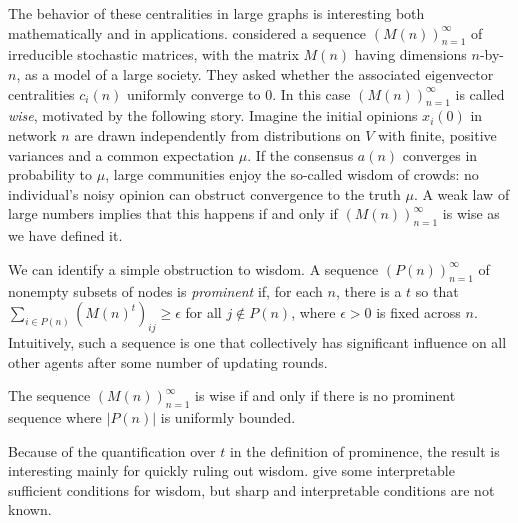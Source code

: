 \documentclass{notices}
\theoremstyle{definition}\newtheorem{problem}{Problem}
\begin{document}
The behavior of these centralities in large graphs is interesting both mathematically and in applications. \cite{GolubJackson2010} considered a sequence $(M(n))_{n=1}^\infty$ of  irreducible stochastic matrices, with the matrix $M(n)$ having dimensions $n$-by-$n$, as a model of a large society. They asked whether the associated eigenvector centralities $c_i(n)$ uniformly converge to $0$. In this case $(M(n))_{n=1}^\infty$ is called \emph{wise}, motivated by the following story. Imagine the initial opinions $x_i(0)$ in network $n$ are drawn independently from distributions on $V$ with finite, positive variances and a common expectation $\mu$. If the consensus $a(n)$ converges in probability  to $\mu$, large communities enjoy the so-called wisdom of crowds: no individual's noisy opinion can obstruct convergence to the truth $\mu$. A weak law of large numbers implies that this happens if and only if $(M(n))_{n=1}^\infty$ is wise as we have defined it. 

We can identify a simple obstruction to wisdom. A sequence $(P(n))_{n=1}^\infty$  of nonempty subsets of nodes is \emph{prominent} if, for each $n$, there is a $t$ so that
$\sum_{i \in P(n)} (M(n)^t)_{ij} \geq \epsilon$ for all $j \notin P(n)$,
where $\epsilon > 0$ is fixed across $n$. Intuitively, such a sequence is one that collectively has significant influence on all other agents after some number of updating rounds.
\begin{prop}  The sequence $(M(n))_{n=1}^\infty$ is wise if and only if there is no prominent sequence where $|P(n)|$ is uniformly bounded. \end{prop}
Because of the quantification over $t$ in the definition of prominence, the result is interesting mainly for quickly ruling out wisdom. \cite{GolubJackson2010} give some interpretable sufficient conditions for wisdom, but sharp and interpretable conditions are not known.
\end{document}
